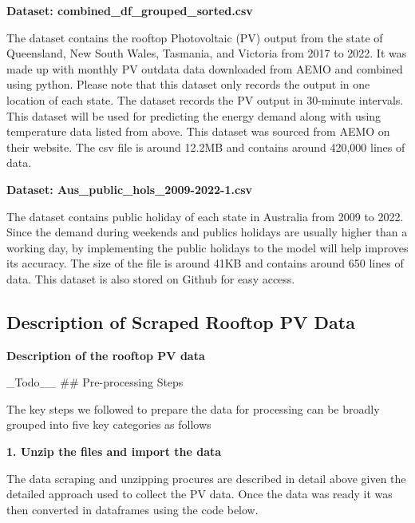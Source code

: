\documentclass[mstat,12pt]{unswthesis}
\begin{document}
\textbf{Dataset: combined\_df\_grouped\_sorted.csv}

The dataset contains the rooftop Photovoltaic (PV) output from the state
of Queensland, New South Wales, Tasmania, and Victoria from 2017 to
2022. It was made up with monthly PV outdata data downloaded from AEMO
and combined using python. Please note that this dataset only records
the output in one location of each state. The dataset records the PV
output in 30-minute intervals. This dataset will be used for predicting
the energy demand along with using temperature data listed from above.
This dataset was sourced from AEMO on their website. The csv file is
around 12.2MB and contains around 420,000 lines of data.

\textbf{Dataset: Aus\_public\_hols\_2009-2022-1.csv}

The dataset contains public holiday of each state in Australia from 2009
to 2022. Since the demand during weekends and publics holidays are
usually higher than a working day, by implementing the public holidays
to the model will help improves its accuracy. The size of the file is
around 41KB and contains around 650 lines of data. This dataset is also
stored on Github for easy access.

\subsection{Description of Scraped Rooftop PV
Data}\label{description-of-scraped-rooftop-pv-data}

\textbf{Description of the rooftop PV data}

\_Todo\_\_ \#\# Pre-processing Steps

The key steps we followed to prepare the data for processing can be
broadly grouped into five key categories as follows

\textbf{1. Unzip the files and import the data}

The data scraping and unzipping procures are described in detail above
given the detailed approach used to collect the PV data. Once the data
was ready it was then converted in dataframes using the code below.
\end{document}
